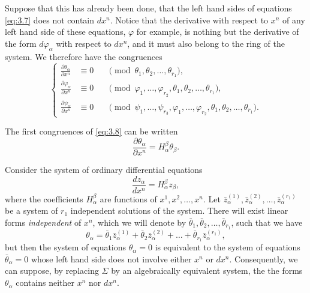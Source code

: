 \documentclass[leqno,11pt]{book}
\numberwithin{equation}{chapter}
\newcommand{\pd}{\partial}
\theoremstyle{shape1}
\theoremstyle{shape0}
\theoremstyle{shape2}
\theoremstyle{definition}
\begin{document}
Suppose that this has already been done, that the left hand sides of equations \eqref{eq:3.7} does not contain $dx^{n}$.  Notice that the derivative with respect to $x^{n}$ of any left hand side of these equations, $\varphi$ for example, is nothing but the derivative of the form $d\varphi_{\alpha}$ with respect to $dx^{n}$, and  it must also belong to the ring of the system. We therefore have the congruences
\begin{equation}
  \label{eq:3.8}
  \left\{
    \begin{aligned}
      \frac{\pd \theta_{\alpha}}{\pd x^{n}}&\equiv 0&&\pmod{\theta_{1},\theta_{2},\dots,\theta_{r_{1}}},\\
      \frac{\pd \varphi_{\alpha}}{\pd x^{n}}&\equiv 0&&\pmod{\varphi_{1},\dots,\varphi_{r_{2}},\theta_{1},\theta_{2},\dots,\theta_{r_{1}}},\\
      \frac{\pd \psi_{\alpha}}{\pd x^{n}}&\equiv 0&&\pmod{\psi_{1},\dots,\psi_{r_{3}},\varphi_{1},\dots,\varphi_{r_{2}},\theta_{1},\theta_{2},\dots,\theta_{r_{1}}}.
    \end{aligned}
  \right.
\end{equation}

The first congruences of \eqref{eq:3.8} can be written
\begin{equation}
  \label{eq:3.9}
  \frac{\pd \theta_{\alpha}}{\pd x^{n}}=H_{\alpha}^{\beta}\theta_{\beta}.
\end{equation}

Consider the system of ordinary differential equations
\begin{equation}
  \label{eq:3.10}
  \frac{dz_{\alpha}}{dx^{n}}=H^{\beta}_{\alpha}z_{\beta},
\end{equation}
where the coefficients $H_{\alpha}^{\beta}$ are functions of $x^{1},x^{2},\dots,x^{n}$. Let $\bar z^{(1)}_{\alpha},\bar z^{(2)}_{\alpha},\dots,\bar z^{(r_{1})}_{\alpha}$ be a system of $r_{1}$ independent solutions of the system. There will exist linear forms \emph{independent} of $x^{n}$, which we will denote by $\bar\theta_{1},\bar\theta_{2},\dots,\bar\theta_{r_{1}}$, such that we have
\[
\theta_{\alpha}=\bar\theta_{1}\bar z^{(1)}_{\alpha}+\bar\theta_{2}\bar z^{(2)}_{\alpha}+\dots+\bar\theta_{r_{1}}\bar z^{(r_{1})}_{\alpha},
\]
but then the system of equations $\theta_{\alpha}=0$ is equivalent to the system of equations $\bar\theta_{\alpha}=0$ whose left hand side does not involve either $x^{n}$ or $dx^{n}$. Consequently, we can suppose, by replacing $\Sigma$ by an algebraically equivalent system, the the forms $\theta_{\alpha}$ contains neither $x^{n}$ nor $dx^{n}$.
\end{document}
